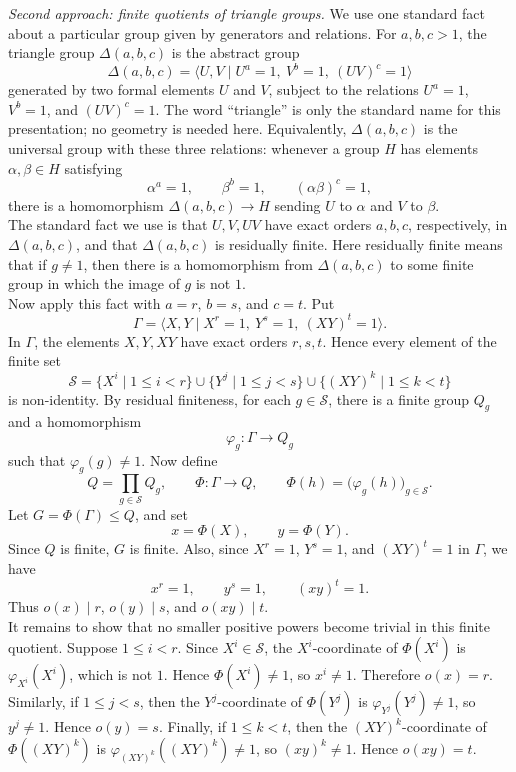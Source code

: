 \documentclass[../Odyssey_Project.tex]{subfiles}
\begin{document}
\begin{solution}
\smallskip\noindent\emph{Second approach: finite quotients of triangle groups.}
We use one standard fact about a particular group given by generators and relations. For \(a,b,c > 1\), the triangle group \(\Delta(a,b,c)\) is the abstract group
\[
    \Delta(a,b,c)
    =
    \langle U,V \mid U^a = 1,\ V^b = 1,\ (UV)^c = 1\rangle
\]
generated by two formal elements \(U\) and \(V\), subject to the relations \(U^a=1\), \(V^b=1\), and \((UV)^c=1\). The word ``triangle'' is only the standard name for this presentation; no geometry is needed here. Equivalently, \(\Delta(a,b,c)\) is the universal group with these three relations: whenever a group \(H\) has elements \(\alpha,\beta \in H\) satisfying
\[
    \alpha^a = 1,
    \qquad
    \beta^b = 1,
    \qquad
    (\alpha\beta)^c = 1,
\]
there is a homomorphism \(\Delta(a,b,c) \to H\) sending \(U\) to \(\alpha\) and \(V\) to \(\beta\). \\
The standard fact we use is that \(U,V,UV\) have exact orders \(a,b,c\), respectively, in \(\Delta(a,b,c)\), and that \(\Delta(a,b,c)\) is residually finite. Here residually finite means that if \(g \ne 1\), then there is a homomorphism from \(\Delta(a,b,c)\) to some finite group in which the image of \(g\) is not \(1\). \\
Now apply this fact with \(a=r\), \(b=s\), and \(c=t\). Put
\[
    \Gamma =
    \langle X,Y \mid X^r = 1,\ Y^s = 1,\ (XY)^t = 1\rangle .
\]
In \(\Gamma\), the elements \(X,Y,XY\) have exact orders \(r,s,t\). Hence every element of the finite set
\[
    \mathcal S
    =
    \{X^i \mid 1 \leq i < r\}
    \cup
    \{Y^j \mid 1 \leq j < s\}
    \cup
    \{(XY)^k \mid 1 \leq k < t\}
\]
is non-identity. By residual finiteness, for each \(g \in \mathcal S\), there is a finite group \(Q_g\) and a homomorphism
\[
    \varphi_g \colon \Gamma \to Q_g
\]
such that \(\varphi_g(g) \ne 1\). Now define
\[
    Q = \prod_{g \in \mathcal S} Q_g,
    \qquad
    \Phi \colon \Gamma \to Q,
    \qquad
    \Phi(h) = \bigl(\varphi_g(h)\bigr)_{g \in \mathcal S}.
\]
Let \(G = \Phi(\Gamma) \leq Q\), and set
\[
    x = \Phi(X),
    \qquad
    y = \Phi(Y).
\]
Since \(Q\) is finite, \(G\) is finite. Also, since \(X^r = 1\), \(Y^s = 1\), and \((XY)^t = 1\) in \(\Gamma\), we have
\[
    x^r = 1,
    \qquad
    y^s = 1,
    \qquad
    (xy)^t = 1.
\]
Thus \(o(x) \mid r\), \(o(y) \mid s\), and \(o(xy) \mid t\). \\
It remains to show that no smaller positive powers become trivial in this finite quotient. Suppose \(1 \leq i < r\). Since \(X^i \in \mathcal S\), the \(X^i\)-coordinate of \(\Phi(X^i)\) is \(\varphi_{X^i}(X^i)\), which is not \(1\). Hence \(\Phi(X^i) \ne 1\), so \(x^i \ne 1\). Therefore \(o(x) = r\). \\
Similarly, if \(1 \leq j < s\), then the \(Y^j\)-coordinate of \(\Phi(Y^j)\) is \(\varphi_{Y^j}(Y^j) \ne 1\), so \(y^j \ne 1\). Hence \(o(y) = s\). Finally, if \(1 \leq k < t\), then the \((XY)^k\)-coordinate of \(\Phi((XY)^k)\) is \(\varphi_{(XY)^k}((XY)^k) \ne 1\), so \((xy)^k \ne 1\). Hence \(o(xy) = t\).


\end{solution}
\end{document}

